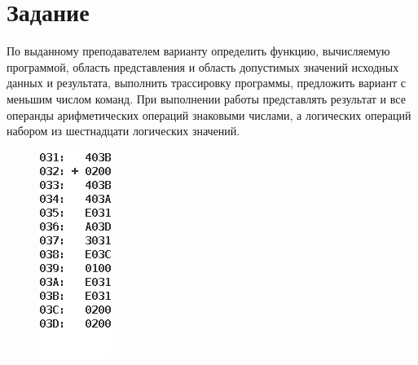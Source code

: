 \documentclass[11pt,a4paper]{article}
\begin{document}
	\section{Задание}
		По выданному преподавателем варианту определить функцию, вычисляемую программой, область представления и область допустимых значений исходных данных и результата, выполнить трассировку программы, предложить вариант с меньшим числом команд. При выполнении работы представлять результат и все операнды арифметических операций знаковыми числами, а логических операций набором из шестнадцати логических значений.
		\begin{figure}[H]
			\centering
			\includegraphics[scale=0.7]{../task.png}
		\end{figure}
\end{document}
